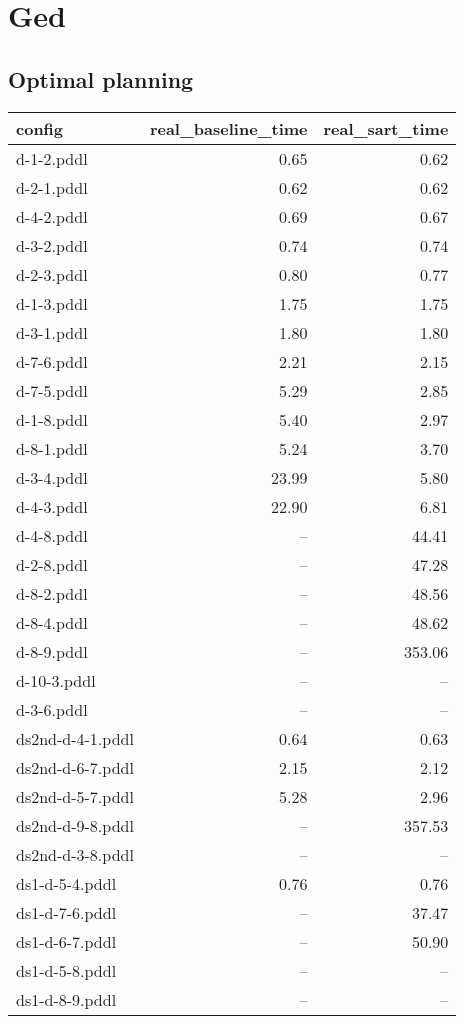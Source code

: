 \documentclass{article}
\begin{document}
                \newpage \section{Ged}
                    \subsection*{Optimal planning}
                    
                            \begin{center}
                            \scriptsize
                            \begin{tabular}{@{}l|r|r@{}}
                            config & real\_baseline\_time & real\_sart\_time\\\midrule
                             d-1-2.pddl&0.65&0.62\\
 d-2-1.pddl&0.62&0.62\\
 d-4-2.pddl&0.69&0.67\\
 d-3-2.pddl&0.74&0.74\\
 d-2-3.pddl&0.80&0.77\\
 d-1-3.pddl&1.75&1.75\\
 d-3-1.pddl&1.80&1.80\\
 d-7-6.pddl&2.21&2.15\\
 d-7-5.pddl&5.29&2.85\\
 d-1-8.pddl&5.40&2.97\\
 d-8-1.pddl&5.24&3.70\\
 d-3-4.pddl&23.99&5.80\\
 d-4-3.pddl&22.90&6.81\\
 d-4-8.pddl&--&44.41\\
 d-2-8.pddl&--&47.28\\
 d-8-2.pddl&--&48.56\\
 d-8-4.pddl&--&48.62\\
 d-8-9.pddl&--&353.06\\
 d-10-3.pddl&--&--\\
 d-3-6.pddl&--&--\\
 ds2nd-d-4-1.pddl&0.64&0.63\\
 ds2nd-d-6-7.pddl&2.15&2.12\\
 ds2nd-d-5-7.pddl&5.28&2.96\\
 ds2nd-d-9-8.pddl&--&357.53\\
 ds2nd-d-3-8.pddl&--&--\\
 ds1-d-5-4.pddl&0.76&0.76\\
 ds1-d-7-6.pddl&--&37.47\\
 ds1-d-6-7.pddl&--&50.90\\
 ds1-d-5-8.pddl&--&--\\
 ds1-d-8-9.pddl&--&--
                            \end{tabular}
                            \end{center}
                    
\end{document}
